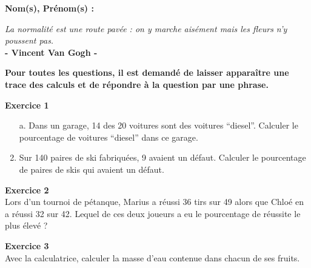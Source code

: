 \documentclass[12pt]{article}
\newcommand{\Pointille}[1][3]{\multido{}{#1}{    \makebox[\linewidth]{\dotfill}\\[\parskip]}}
\begin{document}
\setlength{\columnseprule}{1pt}


\textbf{Nom(s), Prénom(s) :}

\begin{center}
  \textit{La normalité est une route pavée : on y marche aisément mais les fleurs n'y poussent pas.}\\ \textbf{- Vincent Van Gogh -}
\end{center}

\textbf{Pour toutes les questions, il est demandé de laisser apparaître une trace des calculs et de répondre à la question par une phrase.}


\textbf{Exercice 1}

\begin{multicols}{2}

  \begin{enumerate}
  \item[a.] Dans un garage, 14 des 20 voitures sont des voitures ``diesel''. Calculer le pourcentage de voitures ``diesel'' dans ce garage.\\
    \Pointille[5]
  \item Sur 140 paires de ski fabriquées, 9 avaient un défaut. Calculer le pourcentage de paires de skis qui avaient un défaut.\\
    \Pointille[5]
  \end{enumerate}

\end{multicols}


\begin{multicols}{2}

  \textbf{Exercice 2}\\
  Lors d'un tournoi de pétanque, Marius a réussi 36 tirs sur 49 alors que Chloé en a réussi 32 sur 42. Lequel de ces deux joueurs a eu le pourcentage de réussite le plus élevé ?\\ \vspace{0.5cm}
  \Pointille[7]

\end{multicols}

\textbf{Exercice 3}\\
Avec la calculatrice, calculer la masse d'eau contenue dans chacun de ses fruits.
\end{document}
